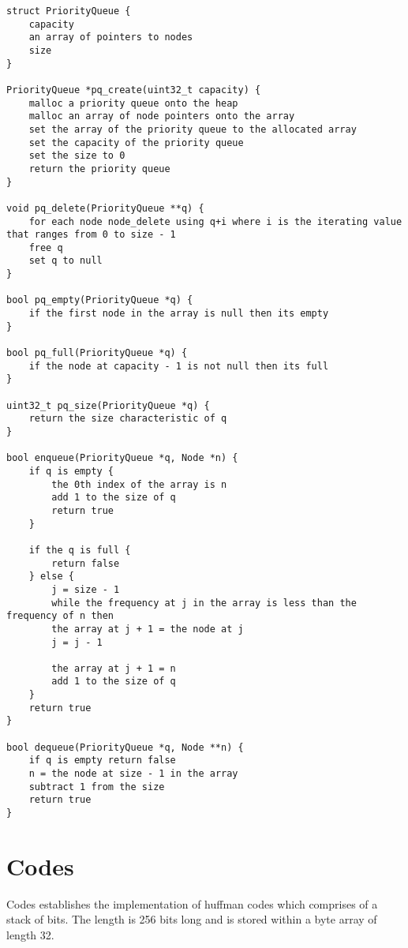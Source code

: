 \documentclass[11pt]{article}
\begin{document}
\begin{verbatim}
struct PriorityQueue {
    capacity
    an array of pointers to nodes
    size
}

PriorityQueue *pq_create(uint32_t capacity) {
    malloc a priority queue onto the heap
    malloc an array of node pointers onto the array
    set the array of the priority queue to the allocated array
    set the capacity of the priority queue
    set the size to 0
    return the priority queue
}

void pq_delete(PriorityQueue **q) {
    for each node node_delete using q+i where i is the iterating value that ranges from 0 to size - 1
    free q
    set q to null
}

bool pq_empty(PriorityQueue *q) {
    if the first node in the array is null then its empty
}

bool pq_full(PriorityQueue *q) {
    if the node at capacity - 1 is not null then its full
}

uint32_t pq_size(PriorityQueue *q) {
    return the size characteristic of q
}

bool enqueue(PriorityQueue *q, Node *n) {
    if q is empty {
        the 0th index of the array is n
        add 1 to the size of q
        return true
    }
    
    if the q is full {
        return false
    } else {
        j = size - 1
        while the frequency at j in the array is less than the frequency of n then 
        the array at j + 1 = the node at j
        j = j - 1
        
        the array at j + 1 = n
        add 1 to the size of q
    }
    return true
}

bool dequeue(PriorityQueue *q, Node **n) {
    if q is empty return false
    n = the node at size - 1 in the array
    subtract 1 from the size
    return true
}

\end{verbatim}

\section{Codes}
Codes establishes the implementation of huffman codes which comprises of a stack of bits. The length is 256 bits long and is stored within a byte array of length 32.
\end{document}
